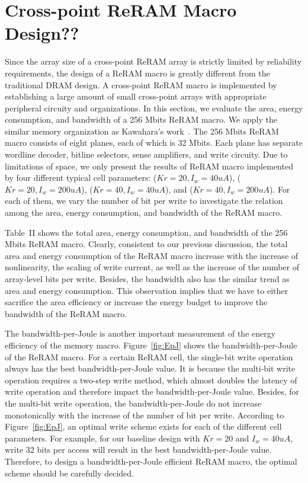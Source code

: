 \vspace{-5pt}
\section{Cross-point ReRAM Macro Design??}\label{sec:macro}
Since the array size of a cross-point ReRAM array is strictly limited by
reliability requirements, the design of a ReRAM macro is greatly different
from the traditional DRAM design. A cross-point ReRAM macro is implemented
by establishing a large amount of small cross-point arrays with
appropriate peripheral circuity and organizations. In this section, we
evaluate the area, energy consumption, and bandwidth of a 256 Mbits ReRAM
macro. We apply the similar memory organization as Kawahara's
work~\cite{crossbar_Panasonic}. The 256 Mbits ReRAM macro consists of
eight planes, each of which is 32 Mbits. Each plane has separate wordline
decoder, bitline selectors, sense amplifiers, and write circuity. Due to
limitations of space, we only present the results of ReRAM macro
implemented by four different typical cell parameters: ($Kr=20,
I_w=40uA$), ($Kr=20, I_w=200uA$), ($Kr=40, I_w=40uA$), and ($Kr=40,
I_w=200uA$). For each of them, we vary the number of bit per write to
investigate the relation among the area, energy consumption, and bandwidth
of the ReRAM macro.


Table~II shows the total area, energy consumption, and bandwidth of the
256 Mbits ReRAM macro. Clearly, consistent to our previous discussion, the
total area and energy consumption of the ReRAM macro increase with the
increase of nonlinearity, the scaling of write current, as well as the
increase of the number of array-level bits per write. Besides, the
bandwidth also has the similar trend as area and energy consumption. This
observation implies that we have to either sacrifice the area efficiency
or increase the energy budget to improve the bandwidth of the ReRAM macro.

The bandwidth-per-Joule is another important measurement of the energy
efficiency of the memory macro. Figure~\ref{fig:EpJ} shows the
bandwidth-per-Joule of the ReRAM macro. For a certain ReRAM cell, the
single-bit write operation always has the best bandwidth-per-Joule value.
It is because the multi-bit write operation requires a two-step write
method, which almost doubles the latency of write operation and therefore
impact the bandwidth-per-Joule value. Besides, for the multi-bit write
operation, the bandwidth-per-Joule do not increase monotonically with the
increase of the number of bit per write. According to
Figure~\ref{fig:EpJ}, an optimal write scheme exists for each of the
different cell parameters. For example, for our baseline design with
$Kr=20$ and $I_w=40uA$, write 32 bits per access will result in the best
bandwidth-per-Joule value. Therefore, to design a bandwidth-per-Joule
efficient ReRAM macro, the optimal scheme should be carefully decided.


